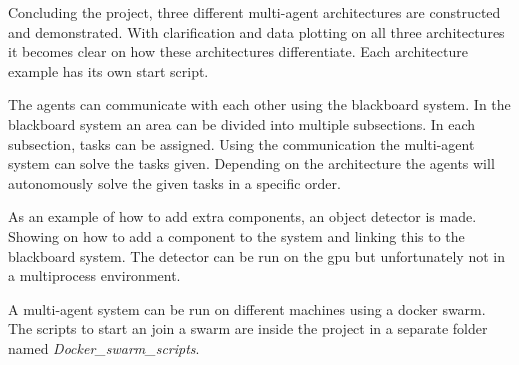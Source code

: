 Concluding the project, three different multi-agent architectures are constructed and demonstrated. With
clarification and data plotting on all three architectures it becomes clear on how these
architectures differentiate. Each architecture example has its own start script.

The agents can communicate with each other using the blackboard system. 
In the blackboard system an area can be divided into multiple subsections. In each 
subsection, tasks can be assigned. Using the communication the multi-agent system can solve the tasks given.
Depending on the architecture the agents will autonomously solve the given tasks in a
specific order.

As an example of how to add extra components, an object detector is made. Showing on
how to add a component to the system and linking this to the blackboard system. The
detector can be run on the \acs{gpu} but unfortunately not in a multiprocess environment.

A multi-agent system can be run on different machines using a docker swarm. The scripts to start an
join a swarm are inside the project in a separate folder named \textit{Docker\_swarm\_scripts}.